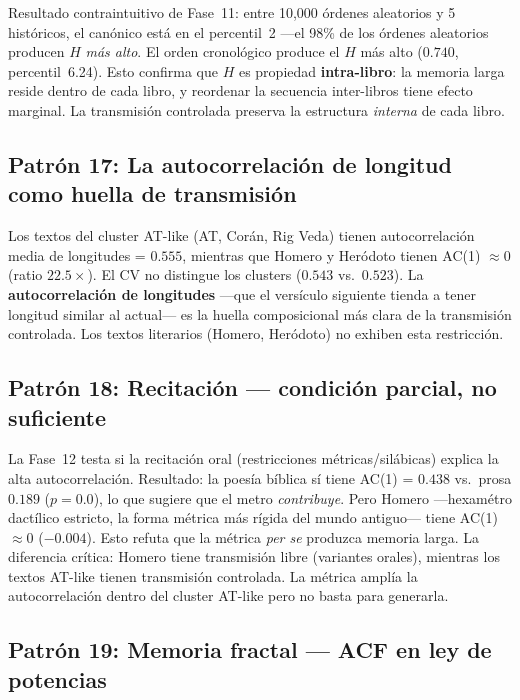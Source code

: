 \documentclass[12pt,a4paper]{article}
\begin{document}
Resultado contraintuitivo de Fase~11: entre 10,000 \'ordenes aleatorios
y 5 hist\'oricos, el can\'onico est\'a en el percentil~2 ---el 98\%
de los \'ordenes aleatorios producen $H$ \emph{m\'as alto}.
El orden cronol\'ogico produce el $H$ m\'as alto ($0.740$, percentil~6.24).
Esto confirma que $H$ es propiedad \textbf{intra-libro}: la memoria larga
reside dentro de cada libro, y reordenar la secuencia inter-libros
tiene efecto marginal. La transmisi\'on controlada preserva la estructura
\emph{interna} de cada libro.

\subsection{Patr\'on 17: La autocorrelaci\'on de longitud como huella de transmisi\'on}

Los textos del cluster AT-like (AT, Cor\'an, Rig Veda) tienen
autocorrelaci\'on media de longitudes = $0.555$, mientras que
Homero y Her\'odoto tienen AC(1) $\approx 0$ (ratio $22.5\times$).
El CV no distingue los clusters ($0.543$ vs.\ $0.523$).
La \textbf{autocorrelaci\'on de longitudes} ---que el vers\'iculo siguiente
tienda a tener longitud similar al actual--- es la huella composicional
m\'as clara de la transmisi\'on controlada. Los textos literarios
(Homero, Her\'odoto) no exhiben esta restricci\'on.

\subsection{Patr\'on 18: Recitaci\'on --- condici\'on parcial, no suficiente}

La Fase~12 testa si la recitaci\'on oral (restricciones m\'etricas/sil\'abicas)
explica la alta autocorrelaci\'on. Resultado: la poes\'ia b\'iblica s\'i tiene
AC(1) = $0.438$ vs.\ prosa $0.189$ ($p = 0.0$), lo que sugiere que el metro
\emph{contribuye}. Pero Homero ---hexam\'etro dact\'ilico estricto, la forma
m\'etrica m\'as r\'igida del mundo antiguo--- tiene AC(1) $\approx 0$ ($-0.004$).
Esto refuta que la m\'etrica \emph{per se} produzca memoria larga.
La diferencia cr\'itica: Homero tiene transmisi\'on libre (variantes orales),
mientras los textos AT-like tienen transmisi\'on controlada. La m\'etrica ampl\'ia
la autocorrelaci\'on dentro del cluster AT-like pero no basta para generarla.

\subsection{Patr\'on 19: Memoria fractal --- ACF en ley de potencias}
\end{document}
